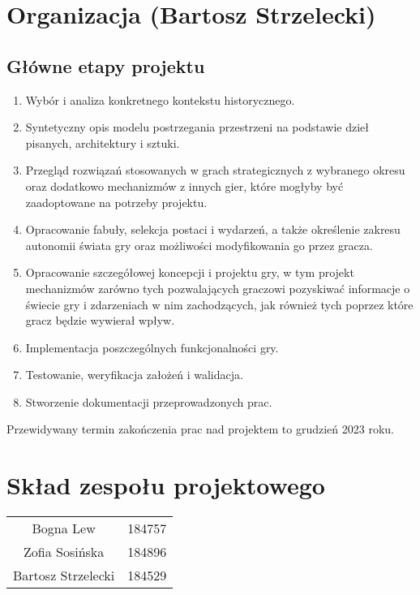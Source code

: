 \section{Organizacja (Bartosz Strzelecki)}
\subsection{Główne etapy projektu}
\begin{enumerate}
  \item Wybór i analiza konkretnego kontekstu historycznego.
  \item Syntetyczny opis modelu postrzegania przestrzeni na podstawie dzieł pisanych, architektury i sztuki.
  \item Przegląd rozwiązań stosowanych w grach strategicznych z wybranego okresu oraz dodatkowo mechanizmów z innych gier, które mogłyby być zaadoptowane na potrzeby projektu.
  \item Opracowanie fabuły, selekcja postaci i wydarzeń, a także określenie zakresu autonomii świata gry oraz możliwości modyfikowania go przez gracza.
  \item Opracowanie szczegółowej koncepcji i projektu gry, w tym projekt mechanizmów zarówno tych pozwalających graczowi pozyskiwać informacje o świecie gry i zdarzeniach w nim zachodzących, jak również tych poprzez które gracz będzie wywierał wpływ.
  \item Implementacja poszczególnych funkcjonalności gry.
  \item Testowanie, weryfikacja założeń i walidacja.
  \item Stworzenie dokumentacji przeprowadzonych prac.
\end{enumerate}
Przewidywany termin zakończenia prac nad projektem to grudzień 2023 roku.
\section{Skład zespołu projektowego}
\begin{center}
  \begin{tabular}{ c c }
    Bogna Lew & 184757 \\
    Zofia Sosińska & 184896 \\
    Bartosz Strzelecki & 184529
  \end{tabular}
\end{center}
